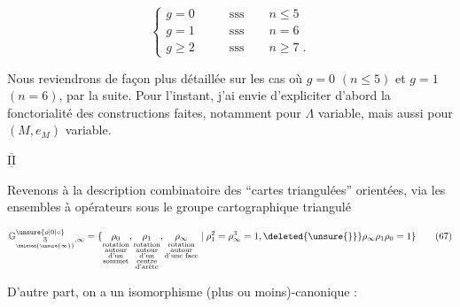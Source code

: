 
\[
\left\{\begin{aligned}
g=0&\qquad\text{sss}\qquad n\leq5\\
g=1&\qquad\text{sss}\qquad n=6\\
g\geq2&\qquad\text{sss}\qquad n\geq7\;.
\end{aligned}\right.\tag*{(66)}
\]

Nous reviendrons de façon plus détaillée sur les cas où $g=0$ $(n\leq5)$ et $g=1$ $(n=6)$, par la suite. Pour l'instant, j'ai envie d'expliciter d'abord la fonctorialité des constructions faites, notamment pour $\Lambda$ variable, mais aussi pour $(M,e_M)$ variable.

$\overline{\underline{\mathrm{II}}}$

Revenons à la description combinatoire  des ``cartes triangulées'' orientées, via les ensembles à opérateurs sous le groupe cartographique triangulé 

\[
\mathbb{G}^{\unsure{o|0|\circ}}_{\underset{\deleted{\unsure{\infty}}}{3},\infty}=
\{\underset{\substack{\text{rotation}\\\text{autour}\\\text{d'un}\\\text{sommet}}}{\rho_0},
\underset{\substack{\text{rotation}\\\text{autour}\\\text{d'un}\\\text{centre}\\\text{d'arête}}}{\rho_1},
\underset{\substack{\text{rotation}\\\text{autour}\\\text{d'une face}}}{\rho_\infty}
\mid \rho_1^2=\rho_\infty^3=1,\deleted{\unsure{\}}}
\rho_\infty\rho_1\rho_0=1\}\tag*{(67)}
\]

D'autre part, on a un isomorphisme (plus ou moins)-canonique :

